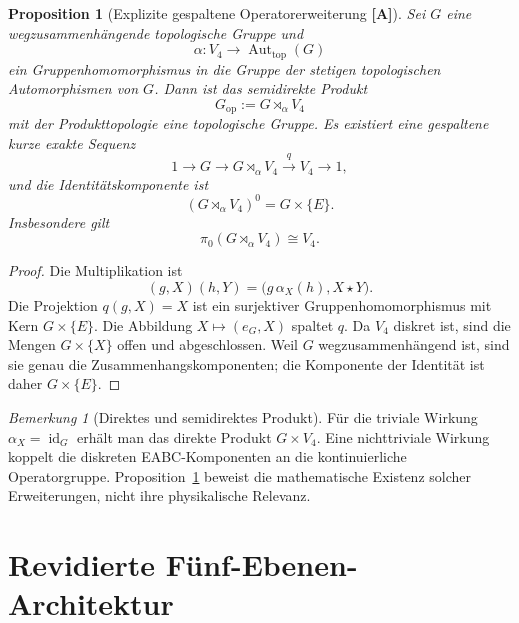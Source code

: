\documentclass[11pt,a4paper,reqno]{amsart}
\newtheorem{proposition}[theorem]{Proposition}
\theoremstyle{definition}
\theoremstyle{remark}
\newtheorem{remark}[theorem]{Bemerkung}
\newcommand{\Aut}{\operatorname{Aut}}
\newcommand{\id}{\operatorname{id}}
\newcommand{\StatusA}{\textnormal{\textbf{[A]}}}
\begin{document}
\begin{proposition}[Explizite gespaltene Operatorerweiterung \StatusA]
\label{prop:semidirect}
Sei $G$ eine wegzusammenhängende topologische Gruppe und
\begin{equation}
\alpha:V_4\longrightarrow\Aut_{\mathrm{top}}(G)
\end{equation}
ein Gruppenhomomorphismus in die Gruppe der stetigen topologischen Automorphismen von $G$. Dann ist das semidirekte Produkt
\begin{equation}
G_{\mathrm{op}}:=G\rtimes_\alpha V_4
\end{equation}
mit der Produkttopologie eine topologische Gruppe. Es existiert eine gespaltene kurze exakte Sequenz
\begin{equation}
1\longrightarrow G
\longrightarrow G\rtimes_\alpha V_4
\xrightarrow{\ q\ }V_4
\longrightarrow1,
\end{equation}
und die Identitätskomponente ist
\begin{equation}
(G\rtimes_\alpha V_4)^0=G\times\{E\}.
\end{equation}
Insbesondere gilt
\begin{equation}
\pi_0(G\rtimes_\alpha V_4)\cong V_4.
\end{equation}
\end{proposition}

\begin{proof}
Die Multiplikation ist
\begin{equation}
(g,X)(h,Y)
=
\bigl(g\,\alpha_X(h),X\star Y\bigr).
\end{equation}
Die Projektion $q(g,X)=X$ ist ein surjektiver Gruppenhomomorphismus mit Kern $G\times\{E\}$. Die Abbildung $X\mapsto(e_G,X)$ spaltet $q$. Da $V_4$ diskret ist, sind die Mengen $G\times\{X\}$ offen und abgeschlossen. Weil $G$ wegzusammenhängend ist, sind sie genau die Zusammenhangskomponenten; die Komponente der Identität ist daher $G\times\{E\}$.
\end{proof}

\begin{remark}[Direktes und semidirektes Produkt]
Für die triviale Wirkung $\alpha_X=\id_G$ erhält man das direkte Produkt $G\times V_4$. Eine nichttriviale Wirkung koppelt die diskreten EABC-Komponenten an die kontinuierliche Operatorgruppe. Proposition~\ref{prop:semidirect} beweist die mathematische Existenz solcher Erweiterungen, nicht ihre physikalische Relevanz.
\end{remark}

\section{Revidierte Fünf-Ebenen-Architektur}
\end{document}
